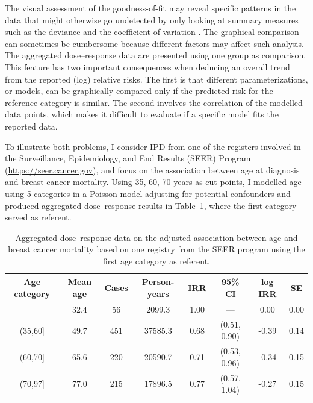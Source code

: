 \documentclass[11pt,a4paper,twoside,openany]{book}\usepackage{knitr}
\begin{document}
{{The visual assessment of the goodness-of-fit may reveal specific patterns in the data that might otherwise go undetected by only looking at summary measures such as the deviance and the coefficient of variation \citep{kvaalseth1985cautionary}. The graphical comparison can sometimes be cumbersome because different factors may affect such analysis. The aggregated dose--response data are presented using one group as comparison. This feature has two important consequences when deducing an overall trend from the reported (log) relative risks. 
The first is that different parameterizations, or models, can be graphically compared only if the predicted risk for the reference category is similar. The second involves the correlation of the modelled data points, which makes it difficult to evaluate if a specific model fits the reported data. 

To illustrate both problems, I consider IPD from one of the registers involved in the Surveillance, Epidemiology, and End Results (SEER) Program (\url{https://seer.cancer.gov}), and focus on the association between age at diagnosis and breast cancer mortality. Using 35, 60, 70 years as cut points, I modelled age using 5 categories in a Poisson model adjusting for potential confounders and produced aggregated dose--response results in Table~\ref{tab:breast_ad}, where the first category served as referent. 

\begin{table}[ht]
\centering
\caption{Aggregated dose--response data on the adjusted association between age and breast cancer mortality based on one registry from the SEER program using the first age category as referent.
         } 
\label{tab:breast_ad}
\begin{tabular}{cccccccc}
  \hline
Age category & Mean age & Cases & Person-years & IRR & 95\% CI & log IRR & SE \\ 
  \hline
[20,35] & 32.4 & 56 & 2099.3 & 1.00 & --- & 0.00 & 0.00 \\ 
  (35,60] & 49.7 & 451 & 37585.3 & 0.68 & (0.51, 0.90) & -0.39 & 0.14 \\ 
  (60,70] & 65.6 & 220 & 20590.7 & 0.71 & (0.53, 0.96) & -0.34 & 0.15 \\ 
  (70,97] & 77.0 & 215 & 17896.5 & 0.77 & (0.57, 1.04) & -0.27 & 0.15 \\ 
   \hline
\end{tabular}
\end{table}


}}
\end{document}
